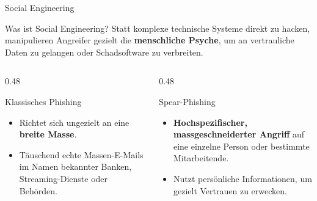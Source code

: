 \documentclass[10pt, aspectratio=169]{beamer}
\begin{document}
\begin{frame}{Social Engineering}
  \pause
  \begin{block}{Was ist Social Engineering?}
    Statt komplexe technische Systeme direkt zu hacken, manipulieren Angreifer gezielt die \textbf{menschliche Psyche}, um an vertrauliche Daten zu gelangen oder Schadsoftware zu verbreiten.
  \end{block}

  \vspace{0.6em}
  \begin{columns}[T]
    \pause
    \begin{column}{0.48\textwidth}
      \begin{block}{Klassisches Phishing}
        \begin{itemize}
          \item Richtet sich ungezielt an eine \textbf{breite Masse}.
          \item Täuschend echte Massen-E-Mails im Namen bekannter Banken, Streaming-Dienste oder Behörden.
        \end{itemize}
      \end{block}
    \end{column}

    \pause
    \begin{column}{0.48\textwidth}
      \begin{block}{Spear-Phishing}
        \begin{itemize}
          \item \textbf{Hochspezifischer, massgeschneiderter Angriff} auf eine einzelne Person oder bestimmte Mitarbeitende.
          \item Nutzt persönliche Informationen, um gezielt Vertrauen zu erwecken.
        \end{itemize}
      \end{block}
    \end{column}
  \end{columns}
\end{frame}
\end{document}

